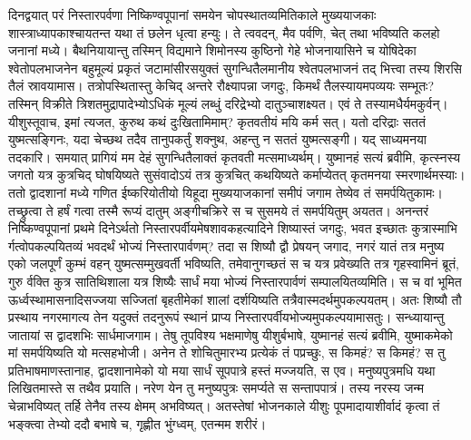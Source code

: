 \adhyAya
{}
\vakya दिनद्वयात् परं निस्तारपर्वणा निष्किण्वपूपानां समयेन चोपस्थातव्यमितिकाले मुख्ययाजकाः शास्त्राध्यापकाश्चायतन्त यथा तं छलेन धृत्वा हन्युः।
\vakya ते त्ववदन्, मैव पर्वणि, चेत् तथा भविष्यति कलहो जनानां मध्ये।
\vakya बैथनियायान्तु तस्मिन् विद्यमाने शिमोनस्य कुष्ठिनो गेहे भोजनायासिने च योषिदेका श्वेतोपलभाजनेन बहुमूल्यं प्रकृतं जटामांसीरसयुक्तं सुगन्धितैलमानीय श्वेतपलभाजनं तद् भित्त्वा तस्य शिरसि तैलं स्रावयामास।
\vakya तत्रोपस्थितास्तु केचिद् अन्तरे रौक्ष्यापन्ना जगदुः, किमर्थं तैलस्यायमपव्ययः सम्भूतः?
\vakya तस्मिन् विक्रीते त्रिशतमुद्रापादेभ्योऽधिकं मूल्यं लब्धुं दरिद्रेभ्यो दातुञ्चाशक्ष्यत। एवं ते तस्यामधैर्यमकुर्वन्।
\vakya यीशुस्तूवाच, इमां त्यजत, कुरुथ कथं दुःखितामिमाम्? कृतवतीयं मयि कर्म सत्।
\vakya यतो दरिद्राः सततं युष्मत्सङ्गिनः, यदा चेच्छथ तदैव तानुपकर्तुं शक्नुथ, अहन्तु न सततं युष्मत्सङ्गी।
\vakya यद् साध्यमनया तदकारि। समयात् प्रागियं मम देहं सुगन्धितैलाक्तं कृतवती मत्समाध्यर्थम्।
\vakya युष्मानहं सत्यं ब्रवीमि, कृत्स्नस्य जगतो यत्र कुत्रचिद् घोषयिष्यते सुसंवादोऽयं तत्र कुत्रचित् कथयिष्यते कर्माप्येतत् कृतमनया स्मरणार्थमस्याः।
\vakya ततो द्वादशानां मध्ये गणित ईष्करियोतीयो यिहूदा मुख्ययाजकानां समीपं जगाम तेष्येव तं समर्पयितुकामः।
\vakya तच्छ्रुत्वा ते हर्षं गत्वा तस्मै रूप्यं दातुम् अङ्गीचक्रिरे स च सुसमये तं समर्पयितुम् अयतत।
\vakya अनन्तरं निष्किण्वपूपानां प्रथमे दिनेऽर्थतो निस्तारपर्वीयमेषशावकहत्यादिने शिष्यास्तं जगदुः, भवत इच्छातः कुत्रास्माभि र्गत्वोपकल्पयितव्यं भवदर्थं भोज्यं निस्तारपार्वणम्?
\vakya तदा स शिष्यौ द्वौ प्रेषयन् जगाद, नगरं यातं तत्र मनुष्य एको जलपूर्णं कुम्भं वहन् युष्मत्सम्मुखवर्ती भविष्यति, तमेवानुगच्छतं स च यत्र प्रवेख्यति तत्र गृहस्वामिनं ब्रूतं,
\vakya गुरु र्वक्ति कुत्र सातिथिशाला यत्र शिष्यैः सार्धं मया भोज्यं निस्तारपार्वणं सम्पालयितव्यमिति।
\vakya स च वां भूमित ऊर्ध्वस्थामासनादिसज्जया सज्जितां बृहतीमेकां शालां दर्शयिष्यति तत्रैवास्मदर्थमुपकल्पयतम्।
\vakya अतः शिष्यौ तौ प्रस्थाय नगरमागत्य तेन यदुक्तं तदनुरूपं स्थानं प्राप्य निस्तारपर्वीयभोज्यमुपकल्पयामासतुः।
\vakya सन्ध्यायान्तु जातायां स द्वादशभिः सार्धमाजगाम।
\vakya तेषु तूपविश्य भक्षमाणेषु यीशुर्बभाषे, युष्मानहं सत्यं ब्रवीमि, युष्माकमेको मां समर्पयिष्यति यो मत्सहभोजी।
\vakya अनेन ते शोचितुमारभ्य प्रत्येकं तं पप्रच्छुः, स किमहं? स किमहं?
\vakya स तु प्रतिभाषमाणस्तानाह, द्वादशानामेको यो मया सार्धं सूपपात्रे हस्तं मज्जयति, स एव।
\vakya मनुष्यपुत्रमधि यथा लिखितमास्ते स तथैव प्रयाति। नरेण येन तु मनुष्यपुत्रः समर्प्यते स सन्तापपात्रं। तस्य नरस्य जन्म चेन्नाभविष्यत् तर्हि तेनैव तस्य क्षेमम् अभविष्यत्।
\vakya अतस्तेषां भोजनकाले यीशुः पूपमादायाशीर्वादं कृत्वा तं भङ्क्त्वा तेभ्यो ददौ बभाषे च, गृह्णीत भुंग्ध्वम्, एतन्मम शरीरं।
